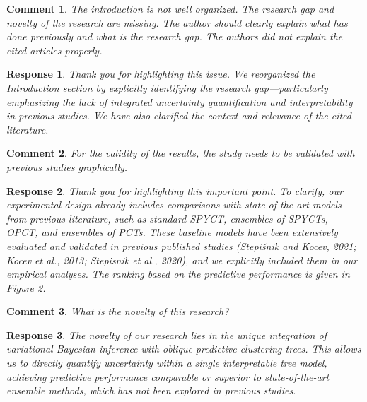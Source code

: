 \documentclass [a4paper,11pt]{article}
\theoremstyle{blue}
\newtheorem{question}{Comment}[section]
\theoremstyle{blue}
\theoremstyle{note}
\newtheorem{answer}{Response}[section]
\theoremstyle{note}
\begin{document}
\begin{question}

The introduction is not well organized. The research gap and novelty of the research are missing. The author should clearly explain what has done previously and what is the research gap. The authors did not explain the cited articles properly.

\end{question}

\begin{answer}

Thank you for highlighting this issue. We reorganized the Introduction section by explicitly identifying the research gap—particularly emphasizing the lack of integrated uncertainty quantification and interpretability in previous studies. We have also clarified the context and relevance of the cited literature.

\end{answer}

\begin{question}

For the validity of the results, the study needs to be validated with previous studies graphically.

\end{question}

\begin{answer}

Thank you for highlighting this important point.
To clarify, our experimental design already includes comparisons with state-of-the-art models from previous literature, such as standard SPYCT, ensembles of SPYCTs, OPCT, and ensembles of PCTs.
These baseline models have been extensively evaluated and validated in previous published studies (Stepišnik and Kocev, 2021; Kocev et al., 2013; Stepisnik et al., 2020), and we explicitly included them in our empirical analyses. The ranking based on the predictive performance is given in Figure 2.

\end{answer}

\begin{question}

What is the novelty of this research?

\end{question}

\begin{answer}

The novelty of our research lies in the unique integration of variational Bayesian inference with oblique predictive clustering trees. This allows us to directly quantify uncertainty within a single interpretable tree model, achieving predictive performance comparable or superior to state-of-the-art ensemble methods, which has not been explored in previous studies.

\end{answer}
\end{document}
